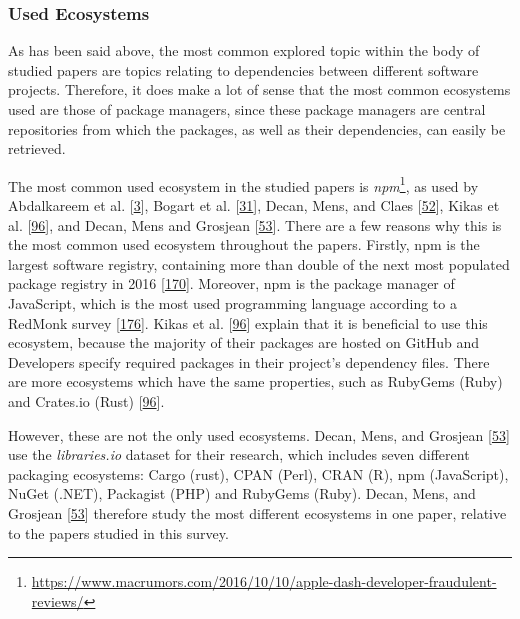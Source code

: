 \documentclass[]{book}
\let\rmarkdownfootnote\footnote%
\def\footnote{\protect\rmarkdownfootnote}
\begin{document}
\subsubsection{Used Ecosystems}\label{used-ecosystems}

As has been said above, the most common explored topic within the body
of studied papers are topics relating to dependencies between different
software projects. Therefore, it does make a lot of sense that the most
common ecosystems used are those of package managers, since these
package managers are central repositories from which the packages, as
well as their dependencies, can easily be retrieved.

The most common used ecosystem in the studied papers is
\emph{npm}\footnote{\url{https://www.macrumors.com/2016/10/10/apple-dash-developer-fraudulent-reviews/}},
as used by Abdalkareem et al.
{[}\protect\hyperlink{ref-Abdalkareem2017}{3}{]}, Bogart et al.
{[}\protect\hyperlink{ref-Bogart2016}{31}{]}, Decan, Mens, and Claes
{[}\protect\hyperlink{ref-Decan2017}{52}{]}, Kikas et al.
{[}\protect\hyperlink{ref-Kikas2017}{96}{]}, and Decan, Mens and
Grosjean {[}\protect\hyperlink{ref-Decan2018}{53}{]}. There are a few
reasons why this is the most common used ecosystem throughout the
papers. Firstly, npm is the largest software registry, containing more
than double of the next most populated package registry in 2016
{[}\protect\hyperlink{ref-Linux2016}{170}{]}. Moreover, npm is the
package manager of JavaScript, which is the most used programming
language according to a RedMonk survey
{[}\protect\hyperlink{ref-RedMonk2018}{176}{]}. Kikas et al.
{[}\protect\hyperlink{ref-Kikas2017}{96}{]} explain that it is
beneficial to use this ecosystem, because the majority of their packages
are hosted on GitHub and Developers specify required packages in their
project's dependency files. There are more ecosystems which have the
same properties, such as RubyGems (Ruby) and Crates.io (Rust)
{[}\protect\hyperlink{ref-Kikas2017}{96}{]}.

However, these are not the only used ecosystems. Decan, Mens, and
Grosjean {[}\protect\hyperlink{ref-Decan2018}{53}{]} use the
\emph{libraries.io} dataset for their research, which includes seven
different packaging ecosystems: Cargo (rust), CPAN (Perl), CRAN (R), npm
(JavaScript), NuGet (.NET), Packagist (PHP) and RubyGems (Ruby). Decan,
Mens, and Grosjean {[}\protect\hyperlink{ref-Decan2018}{53}{]} therefore
study the most different ecosystems in one paper, relative to the papers
studied in this survey.
\end{document}
